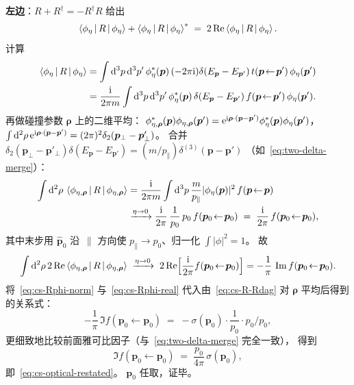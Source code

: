 \begin{proof*}
\textbf{左边}：$R + R^\dagger = -R^\dagger R$ 给出
\begin{equation}
\left\langle \phi_\eta \,\middle|\, R \,\middle|\, \phi_\eta \right\rangle + \left\langle \phi_\eta \,\middle|\, R \,\middle|\, \phi_\eta \right\rangle^*
\;=\; 2\Re\left\langle \phi_\eta \,\middle|\, R \,\middle|\, \phi_\eta \right\rangle.
\end{equation}
计算
\begin{align}
\left\langle \phi_\eta \,\middle|\, R \,\middle|\, \phi_\eta \right\rangle
&= \int\mathrm{d}^3 p\,\mathrm{d}^3 p'\,\phi_\eta^*(\bm{p})\,
(-2\pi\mathrm{i})\delta(E_{\bm{p}}-E_{\bm{p}'})\,t(\bm{p}\!\leftarrow\!\bm{p}')\,\phi_\eta(\bm{p}')\\
&= \frac{\mathrm{i}}{2\pi m}\int\mathrm{d}^3 p\,\mathrm{d}^3 p'\,\phi_\eta^*(\bm{p})\,
\delta(E_{\bm{p}}-E_{\bm{p}'})\,f(\bm{p}\!\leftarrow\!\bm{p}')\,\phi_\eta(\bm{p}').
\nonumber
\end{align}
再做碰撞参数 $\bm{\rho}$ 上的二维平均：
$\phi_{\eta,\bm{\rho}}^*(\bm{p})\phi_{\eta,\bm{\rho}}(\bm{p}') = \mathrm{e}^{\mathrm{i}\bm{\rho}\cdot(\bm{p}-\bm{p}')}\phi_\eta^*(\bm{p})\phi_\eta(\bm{p}')$，
$\int\mathrm{d}^2\rho\,\mathrm{e}^{\mathrm{i}\bm{\rho}\cdot(\bm{p}-\bm{p}')} = (2\pi)^2\delta_2(\bm{p}_\perp-\bm{p}'_\perp)$。
合并 $\delta_2(\bm{p}_\perp-\bm{p}'_\perp)\delta(E_{\bm{p}}-E_{\bm{p}'}) = (m/p_\parallel)\delta^{(3)}(\bm{p}-\bm{p}')$
（如~\eqref{eq:two-delta-merge}）：
\begin{align}
\int\mathrm{d}^2\rho\,\left\langle \phi_{\eta,\bm{\rho}} \,\middle|\, R \,\middle|\, \phi_{\eta,\bm{\rho}} \right\rangle
&= \frac{\mathrm{i}}{2\pi m}\int\mathrm{d}^3 p\,\frac{m}{p_\parallel}|\phi_\eta(\bm{p})|^2\,f(\bm{p}\!\leftarrow\!\bm{p})\\
&\xrightarrow{\eta\to 0}\frac{\mathrm{i}}{2\pi}\,\frac{1}{p_0}\,p_0\,f(\bm{p}_0\!\leftarrow\!\bm{p}_0)
\;=\; \frac{\mathrm{i}}{2\pi}\,f(\bm{p}_0\!\leftarrow\!\bm{p}_0),
\nonumber
\end{align}
其中末步用 $\hat{\bm{p}}_0$ 沿~$\parallel$ 方向使 $p_\parallel\to p_0$、归一化 $\int|\phi|^2 = 1$。
故
\begin{equation}
\int\mathrm{d}^2\rho\,2\Re\left\langle \phi_{\eta,\bm{\rho}} \,\middle|\, R \,\middle|\, \phi_{\eta,\bm{\rho}} \right\rangle
\;\xrightarrow{\eta\to 0}\; 2\Re\!\Big[\frac{\mathrm{i}}{2\pi}f(\bm{p}_0\!\leftarrow\!\bm{p}_0)\Big]
= -\frac{1}{\pi}\,\Im f(\bm{p}_0\!\leftarrow\!\bm{p}_0).
\label{eq:cs-Rphi-real}
\end{equation}
将~\eqref{eq:cs-Rphi-norm} 与~\eqref{eq:cs-Rphi-real} 代入由~\eqref{eq:cs-R-Rdag}
对 $\bm{\rho}$ 平均后得到的关系式：
\begin{equation}
-\frac{1}{\pi}\,\Im f(\bm{p}_0\!\leftarrow\!\bm{p}_0) \;=\; -\sigma(\bm{p}_0)\cdot\frac{1}{p_0}\cdot p_0 / p_0,
\end{equation}
更细致地比较前面雅可比因子（与~\eqref{eq:two-delta-merge} 完全一致），
得到
\begin{equation}
\Im f(\bm{p}_0\!\leftarrow\!\bm{p}_0) \;=\; \frac{p_0}{4\pi}\,\sigma(\bm{p}_0),
\end{equation}
即~\eqref{eq:cs-optical-restated}。
$\bm{p}_0$ 任取，证毕。
\end{proof*}

